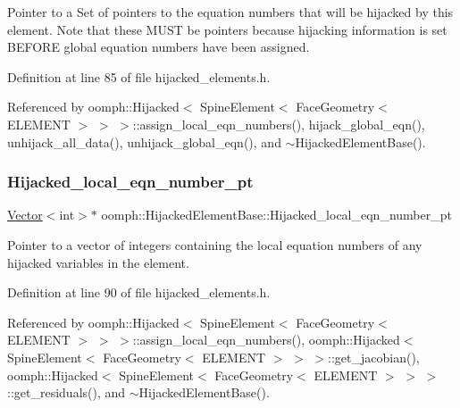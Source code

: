 Pointer to a Set of pointers to the equation numbers that will be hijacked by this element. Note that these M\+U\+ST be pointers because hijacking information is set B\+E\+F\+O\+RE global equation numbers have been assigned. 

Definition at line 85 of file hijacked\+\_\+elements.\+h.



Referenced by oomph\+::\+Hijacked$<$ Spine\+Element$<$ Face\+Geometry$<$ E\+L\+E\+M\+E\+N\+T $>$ $>$ $>$\+::assign\+\_\+local\+\_\+eqn\+\_\+numbers(), hijack\+\_\+global\+\_\+eqn(), unhijack\+\_\+all\+\_\+data(), unhijack\+\_\+global\+\_\+eqn(), and $\sim$\+Hijacked\+Element\+Base().

\mbox{\label{classoomph_1_1HijackedElementBase_ae604da2f744f328f3866a2cefa3aa80c}} 
\subsubsection{\texorpdfstring{Hijacked\+\_\+local\+\_\+eqn\+\_\+number\+\_\+pt}{Hijacked\_local\_eqn\_number\_pt}}
{\footnotesize\ttfamily \hyperlink{classoomph_1_1Vector}{Vector}$<$int$>$$\ast$ oomph\+::\+Hijacked\+Element\+Base\+::\+Hijacked\+\_\+local\+\_\+eqn\+\_\+number\+\_\+pt\hspace{0.3cm}{\ttfamily [protected]}}



Pointer to a vector of integers containing the local equation numbers of any hijacked variables in the element. 



Definition at line 90 of file hijacked\+\_\+elements.\+h.



Referenced by oomph\+::\+Hijacked$<$ Spine\+Element$<$ Face\+Geometry$<$ E\+L\+E\+M\+E\+N\+T $>$ $>$ $>$\+::assign\+\_\+local\+\_\+eqn\+\_\+numbers(), oomph\+::\+Hijacked$<$ Spine\+Element$<$ Face\+Geometry$<$ E\+L\+E\+M\+E\+N\+T $>$ $>$ $>$\+::get\+\_\+jacobian(), oomph\+::\+Hijacked$<$ Spine\+Element$<$ Face\+Geometry$<$ E\+L\+E\+M\+E\+N\+T $>$ $>$ $>$\+::get\+\_\+residuals(), and $\sim$\+Hijacked\+Element\+Base().

